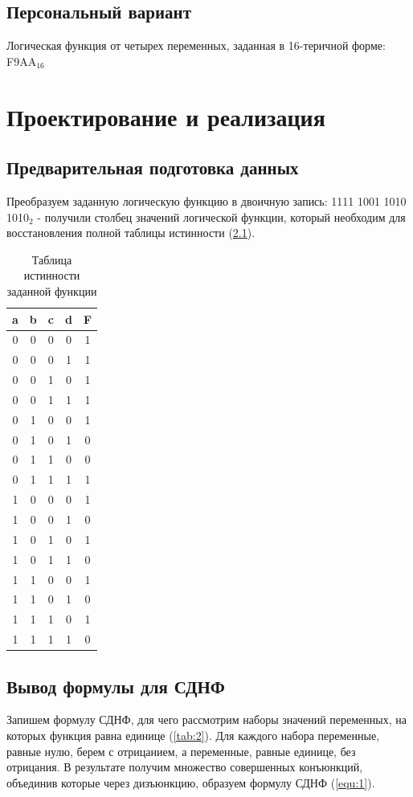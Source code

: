 \documentclass[14pt, a4paper]{extreport}
\begin{document}
\section{Персональный вариант}
Логическая функция от четырех переменных, заданная в 16-теричной форме: F9AA$_{16}$

\chapter{Проектирование и реализация}
\section{Предварительная подготовка данных}
Преобразуем заданную логическую функцию в двоичную запись: 1111 1001 1010 1010$_2$ - получили столбец значений логической функции, который необходим для восстановления полной таблицы истинности (\cref{tab:1}).

\begin{table}[!htbp]
	\caption{Таблица истинности заданной функции}
	\label{tab:1}
	\begin{tabular}{|c|c|c|c|c|}
		\hline
		a & b & c & d & F \\
		\hline
		0 & 0 & 0 & 0 & 1 \\
		\hline
		0 & 0 & 0 & 1 & 1 \\
		\hline
		0 & 0 & 1 & 0 & 1 \\
		\hline
		0 & 0 & 1 & 1 & 1 \\
		\hline
		0 & 1 & 0 & 0 & 1 \\
		\hline
		0 & 1 & 0 & 1 & 0 \\
		\hline
		0 & 1 & 1 & 0 & 0 \\
		\hline
		0 & 1 & 1 & 1 & 1 \\
		\hline
		1 & 0 & 0 & 0 & 1 \\
		\hline
		1 & 0 & 0 & 1 & 0 \\
		\hline
		1 & 0 & 1 & 0 & 1 \\
		\hline
		1 & 0 & 1 & 1 & 0 \\
		\hline
		1 & 1 & 0 & 0 & 1 \\
		\hline
		1 & 1 & 0 & 1 & 0 \\
		\hline
		1 & 1 & 1 & 0 & 1 \\
		\hline
		1 & 1 & 1 & 1 & 0 \\
		\hline
	\end{tabular}
\end{table}

\section{Вывод формулы для СДНФ}
Запишем формулу СДНФ, для чего рассмотрим наборы значений переменных, на которых функция равна единице (\cref{tab:2}). Для каждого набора переменные, равные нулю, берем с отрицанием, а переменные, равные единице, без отрицания. В результате получим множество совершенных конъюнкций, объединив которые через дизъюнкцию, образуем формулу СДНФ (\cref{equ:1}).
\end{document}
